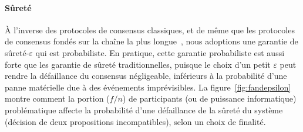 \documentclass[letterpaper,twocolumn,10pt]{article}
\theoremstyle{definition}
\begin{document}
\paragraph{Sûreté} À l'inverse des protocoles de consensus classiques, et de même que les protocoles de consensus fondés sur la chaîne la plus longue~\cite{nakamoto2008bitcoin}, nous adoptions une garantie de sûreté-$\varepsilon$ qui est probabiliste.
En pratique, cette garantie probabiliste est aussi forte que les garantie de sûreté traditionnelles, puisque le choix d'un petit $\varepsilon$ peut rendre la défaillance du consensus négligeable, inférieurs à la probabilité d'une panne matérielle due à des événements imprévisibles.
La figure~\ref{fig:fandepsilon} montre comment la portion ($f/n$) de participants (ou de puissance informatique) problématique affecte la probabilité d'une défaillance de la sûreté du système (décision de deux propositions incompatibles), selon un choix de finalité.
\end{document}
